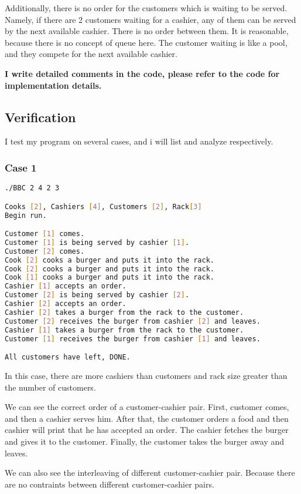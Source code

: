 Additionally, there is no order for the customers which is waiting to be served. Namely, if there are 2 customers waiting for a cashier, any of them can be served by the next available cashier. There is no order between them. 
It is reasonable, because there is no concept of queue here. The customer waiting is like a pool, and they compete for the next available cashier. 

\textbf{I write detailed comments in the code, please refer to the code for implementation details.}

\subsection{Verification}
I test my program on several cases, and i will list and analyze respectively.

\subsubsection{Case 1}
\begin{lstlisting}[language=bash]
./BBC 2 4 2 3

Cooks [2], Cashiers [4], Customers [2], Rack[3]
Begin run.

Customer [1] comes.
Customer [1] is being served by cashier [1].
Customer [2] comes.
Cook [2] cooks a burger and puts it into the rack.
Cook [2] cooks a burger and puts it into the rack.
Cook [1] cooks a burger and puts it into the rack.
Cashier [1] accepts an order.
Customer [2] is being served by cashier [2].
Cashier [2] accepts an order.
Cashier [2] takes a burger from the rack to the customer.
Customer [2] receives the burger from cashier [2] and leaves.
Cashier [1] takes a burger from the rack to the customer.
Customer [1] receives the burger from cashier [1] and leaves.

All customers have left, DONE.
\end{lstlisting}

In this case, there are more cashiers than customers and rack size greater than the number of customers.

We can see the correct order of a customer-cashier pair. First, customer comes, and then a cashier serves him. 
After that, the customer orders a food and then cashier will print that he has accepted an order. The cashier fetches the burger and gives it to the customer. 
Finally, the customer takes the burger away and leaves.

We can also see the interleaving of different customer-cashier pair. Because there are no contraints between different customer-cashier pairs.

